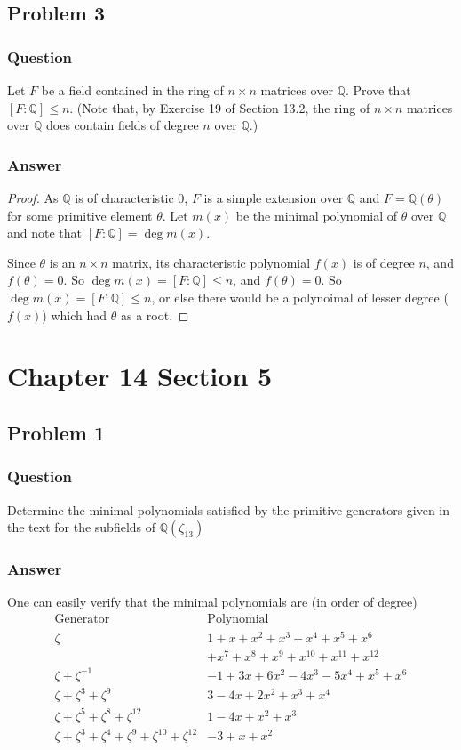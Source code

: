 \documentclass[10pt]{article}
\begin{document}
\subsection{Problem 3}
\subsubsection{Question}
Let $F$ be a field contained in the ring of $n \times n$ matrices over $\mathbb{Q}$. Prove that $[F : \mathbb{Q}] \leq n$. (Note that, by Exercise 19 of Section 13.2, the ring of $n \times n$ matrices over $\mathbb{Q}$ does contain fields of degree $n$ over $\mathbb{Q}$.)
\subsubsection{Answer}
\begin{proof}
As $\mathbb{Q}$ is of characteristic 0, $F$ is a simple extension over $\mathbb{Q}$ and $F= \mathbb{Q}(\theta)$ for some primitive element $\theta$. Let $m(x)$ be the minimal polynomial of $\theta$ over $\mathbb{Q}$ and note that $[F:\mathbb{Q}] = \deg m(x)$.

Since $\theta$ is an $n \times n$ matrix, its characteristic polynomial $f(x)$ is of degree $n$, and $f(\theta)=0$. So $\deg m(x) =[F: \mathbb{Q}] \leq n$, and $f(\theta)=0$. So $\deg m(x) = [F: \mathbb{Q}] \leq n$, or else there would be a polynoimal of lesser degree ($f(x)$) which had $\theta$ as a root.
\end{proof}

\section{Chapter 14 Section 5}
\subsection{Problem 1}
\subsubsection{Question}
Determine the minimal polynomials satisfied by the primitive generators given in the text for the subfields of $\mathbb{Q}(\zeta_{13})$
\subsubsection{Answer}
One can easily verify that the minimal polynomials are (in order of degree)
\[\begin{array}{r|l}
\mathrm{Generator} & \mathrm{Polynomial} \\
\hline
\zeta& 1+x+x^2+x^3+x^4+x^5+x^6\\
&+x^7+x^8+x^9+x^{10}+x^{11}+x^{12} \\
\zeta+\zeta^{-1}&-1+3 x+6 x^2-4 x^3-5 x^4+x^5+x^6  \\
\zeta+\zeta^3+\zeta^9 & 3-4 x+2 x^2+x^3+x^4 \\
\zeta+\zeta^5+\zeta^8+\zeta^{12}& 1-4 x+x^2+x^3 \\
\zeta+\zeta^3+\zeta^4+\zeta^9+\zeta^{10}+\zeta^{12} & -3+x+x^2 \\
\end{array}\]
\end{document}
